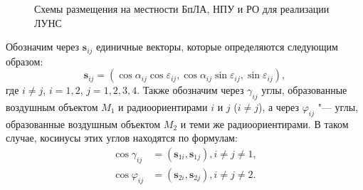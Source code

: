 \documentclass[../main.tex]{subfiles}
\begin{document}
\begin{figure}[htbp]
    \begin{center}


    \caption{Схемы размещения на местности БпЛА, НПУ и РО для реализации ЛУНС}
    \label{fig:systems:pic2}
    \end{center}
\end{figure}

Обозначим через $\mathbf{s}_{ij}$ единичные векторы, которые определяются следующим образом:
\begin{equation}
    \mathbf{s}_{ij} = \left(\cos\alpha_{ij} \cos\varepsilon_{ij}, \cos\alpha_{ij} \sin\varepsilon_{ij}, \sin\varepsilon_{ij}\right),
\end{equation}
где $i \ne j$, $i = 1,2$, $j = 1,2,3,4$. Также обозначим через $\gamma_{ij}$ углы, образованные воздушным объектом $M_1$ и радиоориентирами $i$ и $j$ ($i \ne j$), а через $\varphi_{ij}$ "--- углы, образованные воздушным объектом $M_2$ и теми же радиоориентирами. В таком случае, косинусы этих углов находятся по формулам:
\begin{align*}
    \cos\gamma_{ij} &= \left(\mathbf{s}_{1i}, \mathbf{s}_{1j}\right), i \ne j \ne 1, \\
    \cos\varphi_{ij} &= \left(\mathbf{s}_{2i}, \mathbf{s}_{2j}\right), i \ne j \ne 2.
\end{align*}
\end{document}
